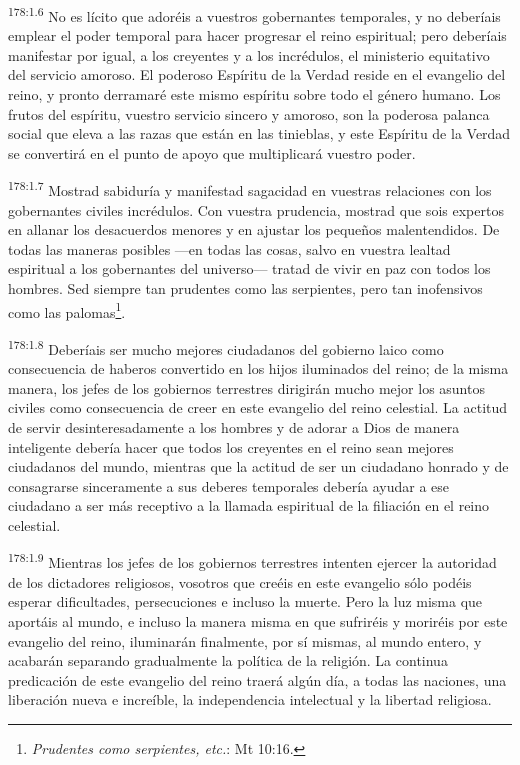 \par 
\textsuperscript{178:1.6} No es lícito que adoréis a vuestros gobernantes temporales, y no deberíais emplear el poder temporal para hacer progresar el reino espiritual; pero deberíais manifestar por igual, a los creyentes y a los incrédulos, el ministerio equitativo del servicio amoroso. El poderoso Espíritu de la Verdad reside en el evangelio del reino, y pronto derramaré este mismo espíritu sobre todo el género humano. Los frutos del espíritu, vuestro servicio sincero y amoroso, son la poderosa palanca social que eleva a las razas que están en las tinieblas, y este Espíritu de la Verdad se convertirá en el punto de apoyo que multiplicará vuestro poder.

\par 
\textsuperscript{178:1.7} Mostrad sabiduría y manifestad sagacidad en vuestras relaciones con los gobernantes civiles incrédulos. Con vuestra prudencia, mostrad que sois expertos en allanar los desacuerdos menores y en ajustar los pequeños malentendidos. De todas las maneras posibles ---en todas las cosas, salvo en vuestra lealtad espiritual a los gobernantes del universo--- tratad de vivir en paz con todos los hombres. Sed siempre tan prudentes como las serpientes, pero tan inofensivos como las palomas\footnote{\textit{Prudentes como serpientes, etc.}: Mt 10:16.}.

\par 
\textsuperscript{178:1.8} Deberíais ser mucho mejores ciudadanos del gobierno laico como consecuencia de haberos convertido en los hijos iluminados del reino; de la misma manera, los jefes de los gobiernos terrestres dirigirán mucho mejor los asuntos civiles como consecuencia de creer en este evangelio del reino celestial. La actitud de servir desinteresadamente a los hombres y de adorar a Dios de manera inteligente debería hacer que todos los creyentes en el reino sean mejores ciudadanos del mundo, mientras que la actitud de ser un ciudadano honrado y de consagrarse sinceramente a sus deberes temporales debería ayudar a ese ciudadano a ser más receptivo a la llamada espiritual de la filiación en el reino celestial.

\par 
\textsuperscript{178:1.9} Mientras los jefes de los gobiernos terrestres intenten ejercer la autoridad de los dictadores religiosos, vosotros que creéis en este evangelio sólo podéis esperar dificultades, persecuciones e incluso la muerte. Pero la luz misma que aportáis al mundo, e incluso la manera misma en que sufriréis y moriréis por este evangelio del reino, iluminarán finalmente, por sí mismas, al mundo entero, y acabarán separando gradualmente la política de la religión. La continua predicación de este evangelio del reino traerá algún día, a todas las naciones, una liberación nueva e increíble, la independencia intelectual y la libertad religiosa.

